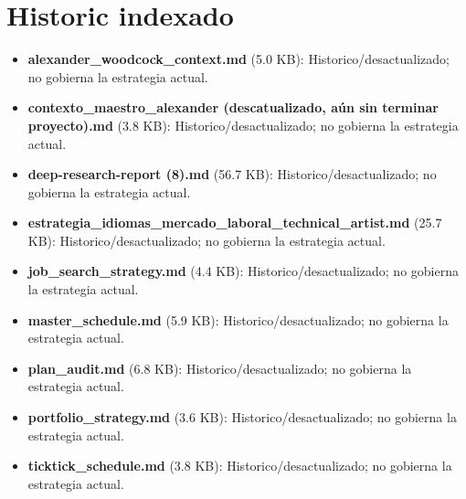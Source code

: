 \section{Historic indexado}


\begin{itemize}
\item \textbf{alexander\_woodcock\_context.md} (5.0 KB): Historico/desactualizado; no gobierna la estrategia actual.
\item \textbf{contexto\_maestro\_alexander (descatualizado, aún sin terminar proyecto).md} (3.8 KB): Historico/desactualizado; no gobierna la estrategia actual.
\item \textbf{deep-research-report (8).md} (56.7 KB): Historico/desactualizado; no gobierna la estrategia actual.
\item \textbf{estrategia\_idiomas\_mercado\_laboral\_technical\_artist.md} (25.7 KB): Historico/desactualizado; no gobierna la estrategia actual.
\item \textbf{job\_search\_strategy.md} (4.4 KB): Historico/desactualizado; no gobierna la estrategia actual.
\item \textbf{master\_schedule.md} (5.9 KB): Historico/desactualizado; no gobierna la estrategia actual.
\item \textbf{plan\_audit.md} (6.8 KB): Historico/desactualizado; no gobierna la estrategia actual.
\item \textbf{portfolio\_strategy.md} (3.6 KB): Historico/desactualizado; no gobierna la estrategia actual.
\item \textbf{ticktick\_schedule.md} (3.8 KB): Historico/desactualizado; no gobierna la estrategia actual.
\end{itemize}

